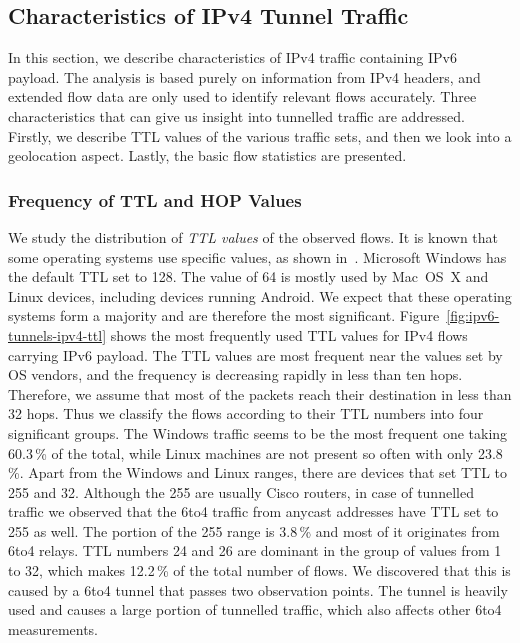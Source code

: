 \subsection{Characteristics of IPv4 Tunnel Traffic} \label{subsec:ipv6-tunnels-outer-traffic-evaluation}

In this section, we describe characteristics of IPv4 traffic containing IPv6 payload. The analysis is based purely on information from IPv4 headers, and extended flow data are only used to identify relevant flows accurately. Three characteristics that can give us insight into tunnelled traffic are addressed. Firstly, we describe TTL values of the various traffic sets, and then we look into a geolocation aspect. Lastly, the basic flow statistics are presented.

\subsubsection{Frequency of TTL and HOP Values}
We study the distribution of \textit{TTL values} of the observed flows. It is known that some operating systems use specific values, as shown in~\cite{Davids-2017-Initial}. Microsoft Windows has the default TTL set to 128. The value of 64 is mostly used by Mac~OS~X and Linux devices, including devices running Android. We expect that these operating systems form a majority and are therefore the most significant. Figure~\ref{fig:ipv6-tunnels-ipv4-ttl} shows the most frequently used TTL values for IPv4 flows carrying IPv6 payload. The TTL values are most frequent near the values set by OS vendors, and the frequency is decreasing rapidly in less than ten hops. Therefore, we assume that most of the packets reach their destination in less than 32 hops. Thus we classify the flows according to their TTL numbers into four significant groups. The Windows traffic seems to be the most frequent one taking 60.3\,\% of the total, while Linux machines are not present so often with only 23.8\,\%. Apart from the Windows and Linux ranges, there are devices that set TTL to 255 and 32. Although the 255 are usually Cisco routers, in case of tunnelled traffic we observed that the 6to4 traffic from anycast addresses have TTL set to 255 as well. The portion of the 255 range is 3.8\,\% and most of it originates from 6to4 relays. TTL numbers 24 and 26 are dominant in the group of values from 1 to 32, which makes 12.2\,\% of the total number of flows. We discovered that this is caused by a 6to4 tunnel that passes two observation points. The tunnel is heavily used and causes a large portion of tunnelled traffic, which also affects other 6to4 measurements.

